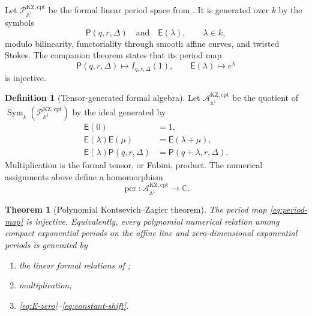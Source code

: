 \documentclass[11pt]{article}
\numberwithin{equation}{section}
\newtheorem{theorem}{Theorem}[section]
\theoremstyle{definition}
\newtheorem{definition}[definition]{Definition}
\theoremstyle{remark}
\newcommand{\C}{\mathbb C}
\newcommand{\Aone}{\mathbb A^1}
\newcommand{\Sym}{\operatorname{Sym}}
\newcommand{\per}{\operatorname{per}}
\newcommand{\Pcal}{\mathcal P}
\newcommand{\Acal}{\mathcal A}
\begin{document}
Let $\Pcal_{\Aone}^{\mathrm{KZ,cpt}}$ be the formal linear period space from
\cite{LongLinearKZ}.  It is generated over $k$ by the symbols
\[
  \mathsf P(q,r,\Delta)
  \quad\text{and}\quad
  \mathsf E(\lambda),\qquad \lambda\in k,
\]
modulo bilinearity, functoriality through smooth affine curves, and twisted
Stokes.  The companion theorem states that its period map
\[
  \mathsf P(q,r,\Delta)\longmapsto I_{q,r,\Delta}(1),
  \qquad
  \mathsf E(\lambda)\longmapsto e^\lambda
\]
is injective.

\begin{definition}[Tensor-generated formal algebra]\label{def:formal-algebra}
Let $\Acal_{\Aone}^{\mathrm{KZ,cpt}}$ be the quotient of
$\Sym_k(\Pcal_{\Aone}^{\mathrm{KZ,cpt}})$ by the ideal generated by
\begin{align}
  \mathsf E(0)&=1,\label{eq:E-zero}\\
  \mathsf E(\lambda)\mathsf E(\mu)
    &=\mathsf E(\lambda+\mu),\label{eq:E-product}\\
  \mathsf E(\lambda)\mathsf P(q,r,\Delta)
    &=\mathsf P(q+\lambda,r,\Delta).\label{eq:constant-shift}
\end{align}
Multiplication is the formal tensor, or Fubini, product.  The numerical
assignments above define a homomorphism
\begin{equation}\label{eq:period-map}
  \per:\Acal_{\Aone}^{\mathrm{KZ,cpt}}\longrightarrow\C.
\end{equation}
\end{definition}

\begin{theorem}[Polynomial Kontsevich--Zagier theorem]\label{thm:main}
The period map \eqref{eq:period-map} is injective.  Equivalently, every
polynomial numerical relation among compact exponential periods on the affine
line and zero-dimensional exponential periods is generated by
\begin{enumerate}[label=\textup{(\roman*)},leftmargin=2.4em]
\item the linear formal relations of \cite{LongLinearKZ};
\item multiplication;
\item \eqref{eq:E-zero}--\eqref{eq:constant-shift}.
\end{enumerate}
\end{theorem}
\end{document}
